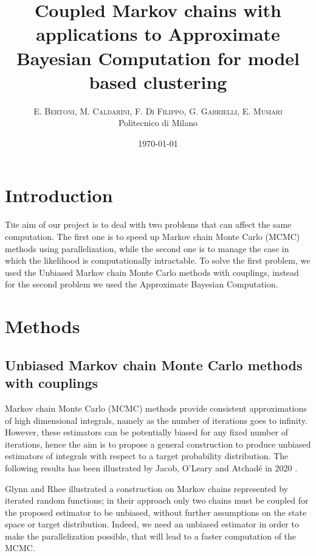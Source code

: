 \documentclass[11pt,a4paper,oneside]{report}
\title{Coupled Markov chains with applications to Approximate Bayesian Computation for model based clustering} %
\author{%
\textsc{E. Bertoni, M. Caldarini, F. Di Filippo, G. Gabrielli, E. Musiari} \\[1ex] %
\normalsize Politecnico di Milano \\ %
}
\date{\today} %
\begin{document}
\maketitle

\tableofcontents



\chapter{Introduction}

\lettrine[nindent=0em,lines=3]{T}he aim of our project is to deal with two problems that can affect the same computation. The first one is to speed up Markov chain Monte Carlo (MCMC) methods using parallelization, while the second one is to manage the case in which the likelihood is computationally intractable. To solve the first problem, we used the Unbiased Markov chain Monte Carlo methods with couplings, instead for the second problem we used the Approximate Bayesian Computation.


\chapter{Methods}

%

\section{Unbiased Markov chain Monte Carlo methods with couplings}


Markov chain Monte Carlo (MCMC) methods provide consistent approximations of high dimensional integrals, namely as the number of iterations goes to infinity. However, these estimators can be potentially biased for any fixed number of iterations, hence the aim is to propose a general construction to produce unbiased estimators of integrals with respect to a target probability distribution. 
The following results has been illustrated by Jacob, O'Leary and Atchadé in 2020 \cite{jacob2020}.

Glynn and Rhee \cite{glynn2014exact} illustrated a construction on Markov chains represented by iterated random functions; in their approach only two chains must be coupled for the proposed estimator to be unbiased, without further assumptions on the state space or target distribution. 
Indeed, we need an unbiased estimator in order to make the parallelization possible, that will lead to a faster computation of the MCMC.
\end{document}
